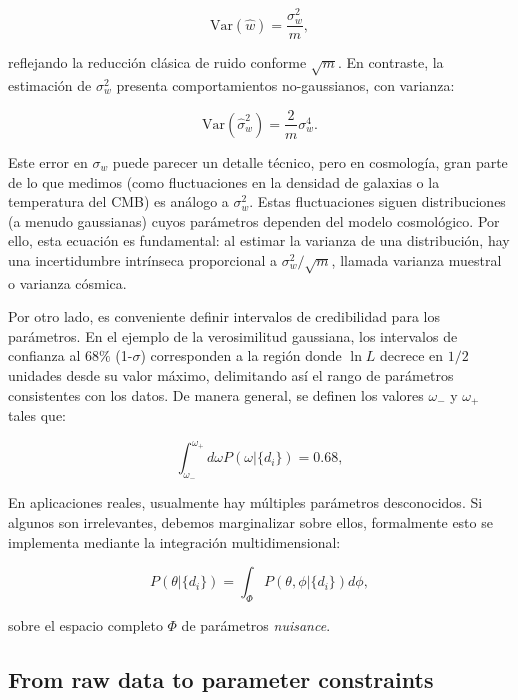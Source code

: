 \begin{equation}
\text{Var}(\hat{w}) =\frac{\sigma_w^2}{m},
\end{equation}

reflejando la reducción clásica de ruido conforme $\sqrt{m}$. En contraste, la estimación de $\sigma_w^2$ presenta comportamientos no-gaussianos, con varianza:

\begin{equation}
\text{Var}(\hat{\sigma}_w^2) = \frac{2}{m}\sigma_w^4.
\end{equation}

Este error en $\sigma_w$ puede parecer un detalle técnico, pero en cosmología, gran parte de lo que medimos (como fluctuaciones en la densidad de galaxias o la temperatura del CMB) es análogo a $\sigma_w^2$. Estas fluctuaciones siguen distribuciones (a menudo gaussianas) cuyos parámetros dependen del modelo cosmológico. Por ello, esta ecuación es fundamental: al estimar la varianza de una distribución, hay una incertidumbre intrínseca proporcional a $\sigma_w^2 / \sqrt{m}$, llamada varianza muestral o varianza cósmica. 

Por otro lado, es conveniente definir intervalos de credibilidad para los parámetros. En el ejemplo de la verosimilitud gaussiana, los intervalos de confianza al $68\%$ (1-$\sigma$) corresponden a la región donde $\ln L$ decrece en $1/2$ unidades desde su valor máximo, delimitando así el rango de parámetros consistentes con los datos. De manera general, se definen los valores $\omega_-$ y $\omega_+$ tales que:

\begin{equation}
\int_{\omega_-}^{\omega_+}d\omega P(\omega|\{d_i\}) = 0.68,
\end{equation}

En aplicaciones reales, usualmente hay múltiples parámetros desconocidos. Si algunos son irrelevantes, debemos marginalizar sobre ellos, formalmente esto se implementa mediante la integración multidimensional: 

\begin{equation}
P(\theta|\{d_i\}) = \int_{\Phi} P(\theta,\phi|\{d_i\}) d\phi,
\end{equation}

sobre el espacio completo $\Phi$ de parámetros \textit{nuisance}.

\subsection{From raw data to parameter constraints}

